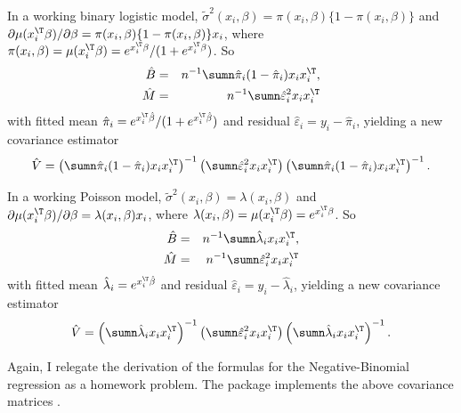 \begin{example}[continued]\label{eg::binarylogisticmodel-continue2}
In a working binary logistic model, $\tilde{\sigma}^2(x_i, \beta)  = \pi(x_i, \beta) \{1-\pi(x_i, \beta) \} $ and $ \partial\mu(x_{i}^{\T} \beta ) / \partial\beta  = \pi(x_i, \beta) \{1-\pi(x_i, \beta)\} x_i$, where $\pi(x_i, \beta)  = \mu(x_i^{\T} \beta) = e^{x_i^{\T} \beta}  / (1 +e^{x_i^{\T} \beta} )$. So
\begin{eqnarray*}
\hat{B} &=& n^{-1}\sumn \hat{\pi}_i (1-\hat{\pi}_i )  x_i x_i^{\T},\\ 
\hat{M} &=& n^{-1}\sumn  \hat{\varepsilon}_i^2   x_i x_i^{\T}
\end{eqnarray*}
with fitted mean $\hat{\pi}_i = e^{x_i^{\T}  \hat{\beta}}  / (1 +e^{x_i^{\T}  \hat{\beta}} )  $ and residual $ \hat{\varepsilon}_i  = y_i - \hat{\pi}_i$, yielding a new covariance estimator
$$
\hat{V} = \left( \sumn \hat{\pi}_i (1-\hat{\pi}_i )   x_i x_i^{\T} \right)^{-1}
\left(\sumn \hat{\varepsilon}_i^2 x_i x_i^{\T} \right)
 \left( \sumn  \hat{\pi}_i (1-\hat{\pi}_i )   x_i x_i^{\T} \right)^{-1} . 
$$
\end{example}


\begin{example}[continued]\label{eg::countpoissonmodel-continue2}
In a working Poisson model, $\tilde{\sigma}^2(x_i, \beta)  = \lambda(x_i, \beta)   $ and $ \partial\mu(x_{i}^{\T} \beta ) / \partial\beta  = \lambda(x_i, \beta)  x_i$, where $\lambda(x_i, \beta)  = \mu(x_i^{\T} \beta) = e^{x_i^{\T} \beta}  $. So
\begin{eqnarray*}
\hat{B} &=& n^{-1}\sumn \hat{\lambda}_i  x_i x_i^{\T},\\ 
\hat{M} &=& n^{-1}\sumn  \hat{\varepsilon}_i^2   x_i x_i^{\T}
\end{eqnarray*}
with fitted mean $ \hat{\lambda}_i =  e^{x_i^{\T} \hat{\beta} }  $ and residual $ \hat{\varepsilon}_i  = y_i -  \hat{\lambda}_i $, yielding a new covariance estimator
$$
\hat{V} = \left( \sumn  \hat{\lambda}_i   x_i x_i^{\T} \right)^{-1}
\left(\sumn \hat{\varepsilon}_i^2 x_i x_i^{\T} \right)
 \left( \sumn \hat{\lambda}_i x_i x_i^{\T} \right)^{-1} . 
$$
\end{example}

 

Again, I relegate the derivation of the formulas for the Negative-Binomial regression as a homework problem. 
The  package  implements the above covariance matrices \citep{zeileis2006object}. 



